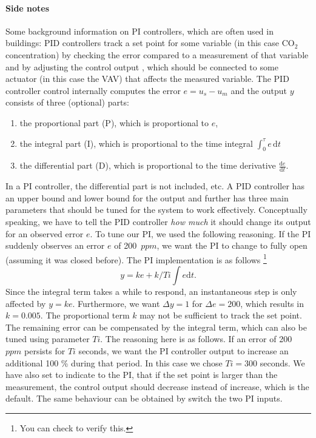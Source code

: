 \documentclass[10pt,a4paper]{article}
\begin{document}
\newpage

\paragraph{Side notes}
Some background information on PI controllers, 
which are often used in buildings: 
PID controllers track a set point for some variable (in this case CO$_2$ concentration)  
by checking the error compared to a measurement of that variable 
and by adjusting the control output , which should be connected
to some actuator (in this case the VAV) that affects the measured variable.
The PID controller control internally computes the error $e=u_s-u_m$
and the output $y$ consists of three (optional) parts: 
\begin{enumerate}
\item the proportional part (P), which is proportional to $e$,
\item the integral part (I), which is proportional to the time integral $\int_0^\tau e \, \mathrm{d}t$
\item the differential part (D), which is proportional to the time derivative $\frac{ \mathrm{d} e}{ \mathrm{d} t}$.
\end{enumerate}
In a PI controller, the differential part is not included, etc.
A PID controller has an upper bound and lower bound for the output 
and further has three main parameters that should be tuned
for the system to work effectively.
Conceptually speaking, we have to tell the PID controller \textit{how much} it
should change its output for an observed error $e$.
To tune our PI, we used the following reasoning.
If the PI suddenly observes an error $e$ of 200~$ppm$,
we want the PI to change to fully open (assuming it was closed before).
The PI implementation is as follows 
\footnote{You can check  to verify this.}
\begin{equation}
y = ke + k/Ti\int e\mathrm{d}t.
\end{equation}
Since the integral term takes a while to respond,
an instantaneous step is only affected by $y=ke$.
Furthermore, we want $\Delta y = 1$  for $\Delta e = 200$,
which results in $k=0.005$.
The proportional term $k$ may not be sufficient
to track the set point. 
The remaining error can be compensated by the integral term, 
which can also be tuned using parameter $Ti$.
The reasoning here is as follows.
If an error of 200~$ppm$ persists for $Ti$ seconds,
we want the PI controller output to increase an additional 100 \% 
during that period.
In this case we chose $Ti=300$ seconds.
We have also set  to indicate to the PI,
that if the set point is larger than the measurement, the control output should
decrease instead of increase, which is the default. The same behaviour
can be obtained by  switch the two PI inputs.\\
\end{document}

